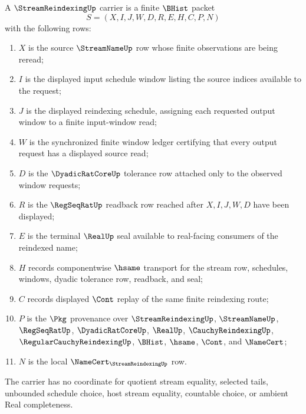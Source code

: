 \begin{definition}
\label{def:stream-reindexing-carrier}
A $\StreamReindexingUp$ carrier is a finite $\BHist$ packet
$$
S=(X,I,J,W,D,R,E,H,C,P,N)
$$
with the following rows:
\begin{enumerate}
\item $X$ is the source $\StreamNameUp$ row whose finite observations are being reread;
\item $I$ is the displayed input schedule window listing the source indices available to the request;
\item $J$ is the displayed reindexing schedule, assigning each requested output window to a finite input-window read;
\item $W$ is the synchronized finite window ledger certifying that every output request has a displayed source read;
\item $D$ is the $\DyadicRatCoreUp$ tolerance row attached only to the observed window requests;
\item $R$ is the $\RegSeqRatUp$ readback row reached after $X,I,J,W,D$ have been displayed;
\item $E$ is the terminal $\RealUp$ seal available to real-facing consumers of the reindexed name;
\item $H$ records componentwise $\hsame$ transport for the stream row, schedules, windows, dyadic tolerance row, readback, and seal;
\item $C$ records displayed $\Cont$ replay of the same finite reindexing route;
\item $P$ is the $\Pkg$ provenance over $\StreamReindexingUp$, $\StreamNameUp$, $\RegSeqRatUp$, $\DyadicRatCoreUp$, $\RealUp$, $\CauchyReindexingUp$, $\RegularCauchyReindexingUp$, $\BHist$, $\hsame$, $\Cont$, and $\NameCert$;
\item $N$ is the local $\NameCert_{\StreamReindexingUp}$ row.
\end{enumerate}
The carrier has no coordinate for quotient stream equality, selected tails, unbounded schedule choice, host stream equality, countable choice, or ambient Real completeness.
\end{definition}

